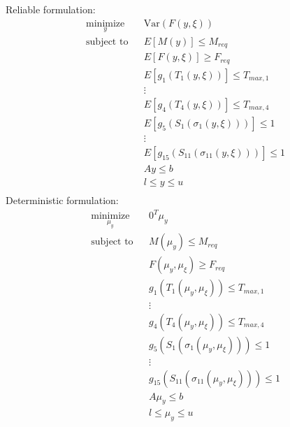 \documentclass{article}
\begin{document}
\begin{multicols}{2}
\centering
Reliable formulation:
\begin{equation}
\label{eq:general_robust_optim}
\begin{aligned}
& \underset{y}{\text{minimize}}
& & \textrm{Var} \left( F(y,\xi) \right) \\
& \text{subject to}
& & E \left[ M(y) \right] \leq M_{req} \\
& & & E \left[ F(y,\xi) \right] \geq F_{req} \\
& & & E \left[ g_1 \left( T_1(y,\xi) \right) \right] \leq T_{max,1} \\
& & & \vdots \\
& & & E \left[ g_4 \left( T_4(y,\xi) \right) \right] \leq T_{max,4} \\
& & & E \left[ g_5 \left( S_1 ( \sigma_1(y,\xi) ) \right) \right] \leq 1 \\
& & & \vdots \\
& & & E \left[ g_{15} \left( S_{11} ( \sigma_{11}(y,\xi)  ) \right) \right] \leq 1 \\
& & & Ay \leq b \\
& & & l \leq y \leq u \\
\end{aligned}
\end{equation}
\vfill \columnbreak
Deterministic formulation: 
\begin{equation}
\label{eq:general_robust_equiv_deterministic_optim}
\begin{aligned}
& \underset{\mu_y}{\text{minimize}}
& & 0^T\mu_y \\
& \text{subject to}
& & M(\mu_y) \leq M_{req} \\
& & & F(\mu_y,\mu_{\xi}) \geq F_{req} \\
& & & g_1 \left( T_1(\mu_y,\mu_{\xi}) \right) \leq T_{max,1} \\
& & & \vdots \\
& & & g_4 \left( T_4(\mu_y,\mu_{\xi}) \right) \leq T_{max,4} \\
& & & g_5 \left( S_1 ( \sigma_1(\mu_y,\mu_{\xi}) ) \right) \leq 1 \\
& & & \vdots \\
& & & g_{15} \left( S_{11} ( \sigma_{11}(\mu_y,\mu_{\xi}) ) \right) \leq 1 \\
& & & A\mu_y \leq b \\
& & & l \leq \mu_y \leq u \\
\end{aligned}
\end{equation}
\end{multicols}
\end{document}
